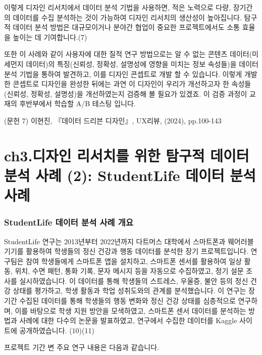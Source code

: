 \documentclass[
  letterpaper,
]{book}
\begin{document}
이렇게 디자인 리서치에서 데이터 분석 기법을 사용하면, 적은 노력으로
다량, 장기간의 데이터를 수집 분석하는 것이 가능하여 디자인 리서치의
생산성이 높아집니다. 탐구적 데이터 분석 방법은 대규모이거나 분야간
협업이 중요한 프로젝트에서도 소통 효율을 높이는 데 기여합니다.(7)

또한 이 사례와 같이 사용자에 대한 질적 연구 방법으로는 알 수 없는 콘텐츠
데이터(미세먼지 데이터)의 특징(신뢰성, 정확성, 설명성에 영향을 미치는
정보 속성들)을 데이터 분석 기법을 통하여 발견하고, 이를 디자인 콘셉트로
개발 할 수 있습니다. 이렇게 개발한 콘셉트로 디자인을 완성한 뒤에는 과연
이 디자인이 우리가 개선하고자 한 속성들(신뢰성, 정확성, 설명성)을
개선하였는지 검증해 볼 필요가 있겠죠. 이 검증 과정이 교재의 후반부에서
학습할 A/B 테스팅 입니다.

(문헌 7) 이현진, 『데이터 드리븐 디자인』, UX리뷰, (2024), pp.100-143

\chapter{ch3.디자인 리서치를 위한 탐구적 데이터 분석 사례 (2):
StudentLife 데이터 분석
사례}\label{ch3.uxb514uxc790uxc778-uxb9acuxc11cuxce58uxb97c-uxc704uxd55c-uxd0d0uxad6cuxc801-uxb370uxc774uxd130-uxbd84uxc11d-uxc0acuxb840-2-studentlife-uxb370uxc774uxd130-uxbd84uxc11d-uxc0acuxb840}

\subsection{StudentLife 데이터 분석 사례
개요}\label{studentlife-uxb370uxc774uxd130-uxbd84uxc11d-uxc0acuxb840-uxac1cuxc694}

StudentLife 연구는 2013년부터 2022년까지 다트머스 대학에서 스마트폰과
웨어러블 기기를 활용하여 학생들의 정신 건강과 행동 데이터를 분석한 장기
프로젝트입니다. 연구팀은 참여 학생들에게 스마트폰 앱을 설치하고,
스마트폰 센서를 활용하여 일상 활동, 위치, 수면 패턴, 통화 기록, 문자
메시지 등을 자동으로 수집하였고, 정기 설문 조사를 실시하였습니다. 이
데이터를 통해 학생들의 스트레스, 우울증, 불안 등의 정신 건강 상태를
평가하고, 학생 활동과 학업 성취도와의 관계를 분석했습니다. 이 연구는
장기간 수집된 데이터를 통해 학생들의 행동 변화와 정신 건강 상태를
심층적으로 연구하며, 이를 바탕으로 학생 지원 방안을 모색하였고, 스마트폰
센서 데이터를 분석하는 방법과 사례에 대한 다수의 논문을 발표하였고,
연구에서 수집한 데이터를 Kaggle 사이트에 공개하였습니다. (10)(11)

프로젝트 기간 변 주요 연구 내용은 다음과 같습니다.
\end{document}
